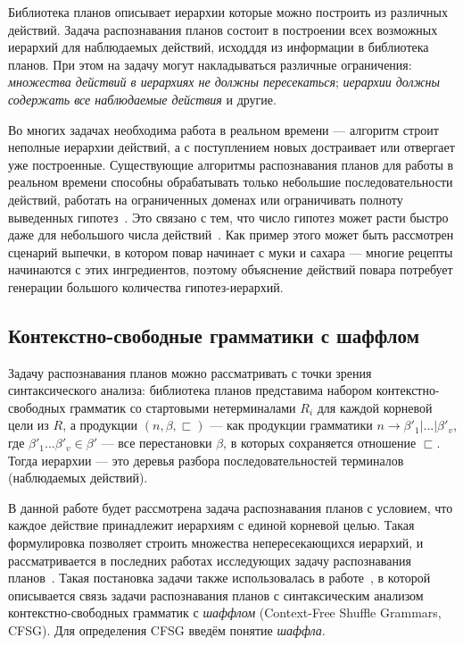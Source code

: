 \documentclass[14pt]{matmex-diploma-custom}
\begin{document}
    Библиотека планов описывает иерархии которые можно построить из различных действий.
    Задача распознавания планов состоит в построении всех возможных иерархий для наблюдаемых действий, исходддя из информации в библиотека планов.
    При этом на задачу могут накладываться различные ограничения:
    \textit{множества действий в иерархиях не должны пересекаться}; \textit{иерархии должны содержать все наблюдаемые действия} и другие.
     
    
    Во многих задачах необходима работа в реальном времени --- алгоритм строит неполные иерархии действий,
    а с поступлением новых достраивает или отвергает уже построенные. Существующие алгоритмы распознавания планов
    для работы в реальном времени способны обрабатывать только небольшие последовательности действий,
    работать на ограниченных доменах или ограничивать полноту выведенных гипотез~\cite{Kabanza2013,WisemanandShieber2014}.
    Это связано с тем, что
    число гипотез может расти быстро даже для небольшого числа действий~\cite{Mirsky2016}. Как пример этого 
    может быть рассмотрен сценарий выпечки, в котором повар начинает с муки и сахара --- многие рецепты 
    начинаются с этих ингредиентов, поэтому объяснение действий повара потребует генерации большого количества гипотез-иерархий.
    
    \subsection{Контекстно-свободные грамматики с шаффлом}
	Задачу распознавания планов можно рассматривать с точки зрения синтаксического анализа:
	библиотека планов представима набором контекстно-свободных грамматик со стартовыми нетерминалами $R_i$ для каждой корневой
	цели из $R$, 
	а продукции $(n, \beta, \sqsubset) $ --- как продукции грамматики $n \rightarrow \beta'_1 | ... | \beta'_v $,
	где $\beta'_1 ... \beta'_v \in \beta'$ --- 
	все перестановки $\beta$, в которых сохраняется отношение $\sqsubset$. Тогда иерархии --- это деревья разбора последовательностей терминалов (наблюдаемых действий).
	
	В данной работе будет рассмотрена задача распознавания планов с условием, что
	каждое действие принадлежит иерархиям с единой корневой целью. Такая формулировка позволяет строить
	множества непересекающихся иерархий, и рассматривается в последних работах исследующих задачу распознавания планов~\cite{maraist2016,Mirsky2016,mirsky2017slim}.
	Такая постановка задачи также использовалась в работе~\cite{maraist2016}, в которой описывается связь задачи распознавания планов
	с синтаксическим анализом контекстно-свободных грамматик с \textit{шаффлом} (Context-Free Shuffle Grammars, CFSG).
	Для определения CFSG введём понятие \textit{шаффла}.
    
\end{document}
